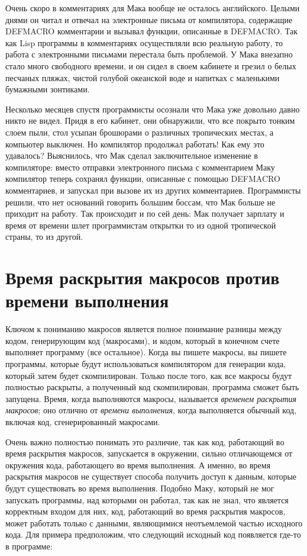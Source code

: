 Очень скоро в комментариях для Мака вообще не осталось английского. Целыми днями он читал
и отвечал на электронные письма от компилятора, содержащие DEFMACRO комментарии и вызывал
функции, описанные в DEFMACRO. Так как Lisp программы в комментариях осуществляли всю
реальную работу, то работа с электронными письмами перестала быть проблемой. У Мака
внезапно стало много свободного времени, и он сидел в своем кабинете и грезил о белых
песчаных пляжах, чистой голубой океанской воде и напитках с маленькими бумажными
зонтиками.

Несколько месяцев спустя программисты осознали что Мака уже довольно давно никто не
видел. Придя в его кабинет, они обнаружили, что все покрыто тонким слоем пыли, стол усыпан
брошюрами о различных тропических местах, а компьютер выключен. Но компилятор продолжал
работать! Как ему это удавалось? Выяснилось, что Мак сделал заключительное изменение в
компиляторе: вместо отправки электронного письма с комментарием Маку компилятор теперь
сохранял функции, описанные с помощью DEFMACRO комментариев, и запускал при вызове их из
других комментариев. Программисты решили, что нет оснований говорить большим боссам, что
Мак больше не приходит на работу. Так происходит и по сей день: Мак получает зарплату и
время от времени шлет программистам открытки то из одной тропической страны, то из другой.

\section{Время раскрытия макросов против времени выполнения}

Ключом к пониманию макросов является полное понимание разницы между кодом, генерирующим
код (макросами), и кодом, который в конечном счете выполняет программу (все
остальное). Когда вы пишете макросы, вы пишете программы, которые будут использоваться
компилятором для генерации кода, который затем будет скомпилирован. Только после того, как
все макросы будут полностью раскрыты, а полученный код скомпилирован, программа сможет
быть запущена. Время, когда выполняются макросы, называется \textit{временем раскрытия
  макросов}; оно отлично от \textit{времени выполнения}, когда выполняется обычный код,
включая код, сгенерированный макросами.

Очень важно полностью понимать это различие, так как код, работающий во время раскрытия
макросов, запускается в окружении, сильно отличающемся от окружения кода, работающего во
время выполнения. А именно, во время раскрытия макросов не существует способа получить
доступ к данным, которые будут существовать во время выполнения. Подобно Маку, который не
мог запускать программы, над которыми он работал, так как не знал, что является корректным
входом для них, код, работающий во время раскрытия макросов, может работать только с
данными, являющимися неотъемлемой частью исходного кода. Для примера предположим, что
следующий исходный код появляется где-то в программе:

